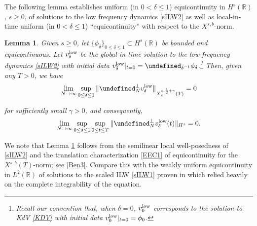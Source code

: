 \documentclass[letterpaper, 11pt,  reqno]{amsart}
\newtheorem{lemma}[theorem]{Lemma}
\newcommand{\1}{\hspace{0.5mm}\textup{I}\hspace{0.5mm}}
\newcommand{\noi}{\noindent}
\newcommand{\R}{\mathbb{R}}
\let\P= \undefined
\newcommand{\P}{\mathbf{P}}
\newcommand{\low}{\textup{low}}
\newcommand{\dl}{\delta}
\newcommand{\g}{\gamma}
\numberwithin{equation}{section}
\numberwithin{theorem}{section}
\begin{document}
The following lemma establishes
uniform (in $0 < \dl \le 1$) equicontinuity 
in $H^s(\R)$, $s \ge 0$, 
of solutions to the low frequency dynamics \eqref{sILW2}
as well
as
local-in-time uniform (in $0 < \dl \le 1$) ``equicontinuity''
with respect to the $X^{s, b}$-norm. 


\begin{lemma}\label{LEM:equi}
Given $s \ge 0$, 
let $\{\phi_\dl\}_{0 \leq  \dl \le 1} \subset H^s(\R)$
be bounded and equicontinuous.
Let  $v_\dl^\low$
be the global-in-time solution
to  the low frequency dynamics
\eqref{sILW2}
 with initial data $v_\dl^\low|_{t = 0} = \P_{ \dl^{-1}} \phi_\dl$.\footnote{Recall our convention
 that, when $\dl = 0$,  
 $v_0^\low$ corresponds to the solution to KdV \eqref{KDV}
 with initial data $v_0^\low|_{t = 0} = \phi_0$.}
 Then, 
given any $T > 0$,
we have 
\begin{align}
\lim_{N \to \infty}
 \sup_{0 \leq  \dl \le 1}
 \| \P_{N}^\perp v_\dl^\low\|_{X_\dl^{s, \frac 12 + \g}(T)} = 0
\label{EC0}
\end{align}
 
\noi
for sufficiently small $\g > 0$,
and consequently,
\begin{align}
 \lim_{N\to \infty} \sup_{0 \le  \dl \le 1}\sup_{0 \le t \le T}
 \| \P_{N}^\perp v_\dl^\low(t)\|_{H^s} = 0.
\label{EC1}
\end{align}




\end{lemma}


We note that 
Lemma \ref{LEM:equi} follows from 
the semilinear local well-posedness of \eqref{sILW2}
and
the translation characterization \eqref{EEC1} of equicontinuity 
for the 
$X^{s,b}(T)$-norm; see \eqref{Ben3}.
Compare this with the  weakly uniform equicontinuity
in $L^2(\R)$
of solutions to the scaled ILW \eqref{sILW1}
proven in \cite{CLOZ}
which relied heavily on the complete integrability of
the equation.
\end{document}
